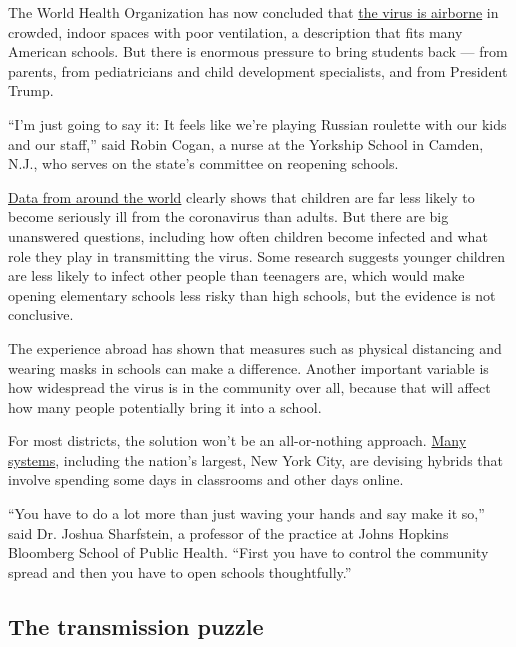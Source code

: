 The World Health Organization has now concluded that
\href{https://slack-redir.net/link?url=https\%3A\%2F\%2Fwww.nytimes3xbfgragh.onion\%2F2020\%2F07\%2F09\%2Fhealth\%2Fvirus-aerosols-who.html}{the
virus is airborne} in crowded, indoor spaces with poor ventilation, a
description that fits many American schools. But there is enormous
pressure to bring students back --- from parents, from pediatricians and
child development specialists, and from President Trump.

``I'm just going to say it: It feels like we're playing Russian roulette
with our kids and our staff,'' said Robin Cogan, a nurse at the Yorkship
School in Camden, N.J., who serves on the state's committee on reopening
schools.

\href{https://www.cdc.gov/coronavirus/2019-ncov/hcp/pediatric-hcp.html\#burden-disease-risk-factors}{Data
from around the world} clearly shows that children are far less likely
to become seriously ill from the coronavirus than adults. But there are
big unanswered questions, including how often children become infected
and what role they play in transmitting the virus. Some research
suggests younger children are less likely to infect other people than
teenagers are, which would make opening elementary schools less risky
than high schools, but the evidence is not conclusive.

The experience abroad has shown that measures such as physical
distancing and wearing masks in schools can make a difference. Another
important variable is how widespread the virus is in the community over
all, because that will affect how many people potentially bring it into
a school.

For most districts, the solution won't be an all-or-nothing approach.
\href{https://bioethics.jhu.edu/research-and-outreach/projects/eschool-initiative/school-policy-tracker/}{Many
systems}, including the nation's largest, New York City, are devising
hybrids that involve spending some days in classrooms and other days
online.

``You have to do a lot more than just waving your hands and say make it
so,'' said Dr. Joshua Sharfstein, a professor of the practice at Johns
Hopkins Bloomberg School of Public Health. ``First you have to control
the community spread and then you have to open schools thoughtfully.''

\hypertarget{the-transmission-puzzle}{%
\subsection{The transmission puzzle}\label{the-transmission-puzzle}}

